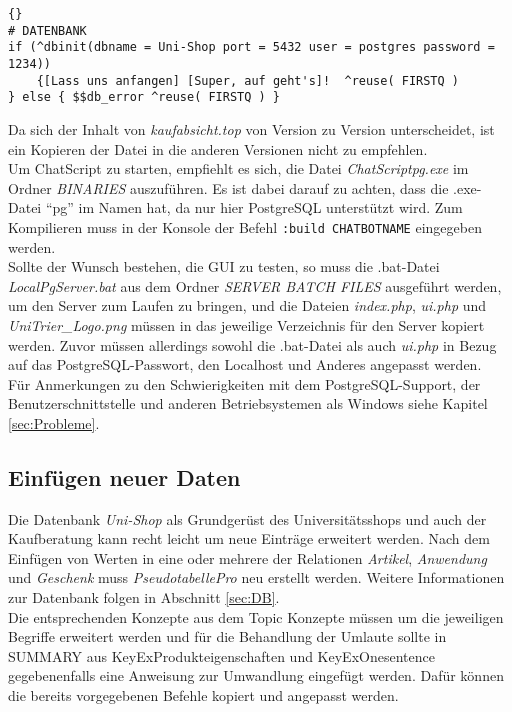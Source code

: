 \begin{lstlisting}{}
# DATENBANK
if (^dbinit(dbname = Uni-Shop port = 5432 user = postgres password = 1234))
	{[Lass uns anfangen] [Super, auf geht's]!  ^reuse( FIRSTQ )
} else { $$db_error ^reuse( FIRSTQ ) }
\end{lstlisting}

Da sich der Inhalt von \textit{kaufabsicht.top} von Version zu Version unterscheidet, ist ein Kopieren der Datei in die anderen Versionen nicht zu empfehlen.\\
Um ChatScript zu starten, empfiehlt es sich, die Datei \textit{ChatScriptpg.exe} im Ordner \textit{BINARIES} auszuführen. Es ist dabei darauf zu achten, dass die .exe-Datei "`pg"' im Namen hat,  da nur hier PostgreSQL unterstützt wird. Zum Kompilieren muss in der Konsole der Befehl \lstinline|:build CHATBOTNAME| eingegeben werden.\\
Sollte der Wunsch bestehen, die GUI zu testen, so muss die .bat-Datei \textit{LocalPgServer.bat} aus dem Ordner \textit{SERVER BATCH FILES} ausgeführt werden, um den Server zum Laufen zu bringen, und die Dateien \textit{index.php}, \textit{ui.php} und \textit{UniTrier\_Logo.png} müssen in das jeweilige Verzeichnis für den Server kopiert werden. Zuvor müssen allerdings sowohl die .bat-Datei als auch \textit{ui.php} in Bezug auf das PostgreSQL-Passwort, den Localhost und Anderes angepasst werden.\\
Für Anmerkungen zu den Schwierigkeiten mit dem PostgreSQL-Support, der Benutzerschnittstelle und anderen Betriebsystemen als Windows siehe Kapitel \ref{sec:Probleme}.\\


\subsection{Einfügen neuer Daten}
\label{sec:neueDaten}
Die Datenbank \textit{Uni-Shop} als Grundgerüst des Universitätsshops und auch der Kaufberatung kann recht leicht um neue Einträge erweitert werden. Nach dem Einfügen von Werten in eine oder mehrere der Relationen \textit{Artikel}, \textit{Anwendung} und \textit{Geschenk} muss \textit{PseudotabellePro} neu erstellt werden. Weitere Informationen zur Datenbank folgen in Abschnitt \ref{sec:DB}.\\
Die entsprechenden Konzepte aus dem Topic Konzepte müssen um die jeweiligen Begriffe erweitert werden und für die Behandlung der Umlaute sollte in SUMMARY aus KeyExProdukteigenschaften und KeyExOnesentence gegebenenfalls eine Anweisung zur Umwandlung eingefügt werden. Dafür können die bereits vorgegebenen Befehle kopiert und angepasst werden.\\


